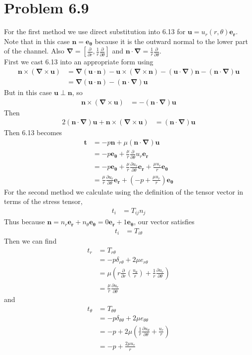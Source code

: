 \documentclass[12pt]{article}
\newcommand{\eq}[1]{\begin{align*}#1\end{align*}}
\newcommand{\p}[2]{\frac{\partial#1}{\partial#2}}
\newcommand{\n}{\bm{\nabla}}
\newcommand{\tc}[3]{#1\times(#2\times#3)}
\begin{document}
\section*{Problem 6.9}
For the first method we use direct substitution into 6.13 for $\bm{u} = u_r(r, \theta)\bm{e_r}$. Note that in this case $\bm{n} = \bm{e_\theta}$ because it is the outward normal to the lower part of the channel. Also $\n = [\p{}{r} ,\frac{1}{r}\p{}{\theta}]$ and $\bm{n}\cdot\n = \frac{1}{r}\p{}{\theta}$.\\
First we cast 6.13 into an appropriate form using
\eq{
	\tc{\bm{n}}{\n}{\bm{u}} &= \n(\bm{u}\cdot\bm{n}) - \tc{\bm{u}}{\n}{\bm{n}} - (\bm{u}\cdot\n)\bm{n} - (\bm{n}\cdot\n)\bm{u}\\
	&= \n(\bm{u}\cdot\bm{n}) - (\bm{n}\cdot\n)\bm{u}
}
But in this case $\bm{u}\perp\bm{n}$, so
\eq{
	\tc{\bm{n}}{\n}{\bm{u}} &= - (\bm{n}\cdot\n)\bm{u}
}
Then
\eq{
	2(\bm{n}\cdot\n)\bm{u} + \tc{\bm{n}}{\n}{\bm{u}} &= (\bm{n}\cdot\n)\bm{u}
}
Then 6.13 becomes
\eq{
	\bm{t} &= -p\bm{n} + \mu(\bm{n}\cdot\n)\bm{u}\\
	&= -p\bm{e_\theta} + \frac{\mu}{r}\p{}{\theta} u_r\bm{e_r}\\
	&= -p\bm{e_\theta} + \frac{\mu}{r}\p{u_r}{\theta}\bm{e_r} + \frac{\mu u_r}{r}\bm{e_\theta}\\
	&= \frac{\mu}{r}\p{u_r}{\theta}\bm{e_r} + \left(-p + \frac{\mu u_r}{r}\right)\bm{e_\theta}
}
For the second method we calculate using the definition of the tensor vector in terms of the stress tensor,
\eq{
	t_i &= T_{ij} n_j
}
Thus because $\bm{n} = n_r\bm{e_r} + n_\theta\bm{e_\theta} = 0\bm{e_r} + 1\bm{e_\theta}$, our vector satisfies
\eq{
	t_i &= T_{i\theta}
}
Then we can find
\eq{
	t_r &= T_{r\theta}\\
	&= -p\delta_{r\theta} + 2\mu e_{r\theta}\\
	&= \mu\left( r\p{}{r}(\frac{u_\theta}{r}) + \frac{1}{r}\p{u_r}{\theta} \right)\\
	&= \frac{\mu}{r}\p{u_r}{\theta}
}
and
\eq{
	t_\theta &= T_{\theta\theta}\\
	&= -p\delta_{\theta\theta} + 2\mu e_{\theta\theta}\\
	&= -p + 2\mu\left( \frac{1}{r}\p{u_\theta}{\theta} + \frac{u_r}{r} \right)\\
	&= -p + \frac{2\mu u_r}{r}
}
\end{document}
